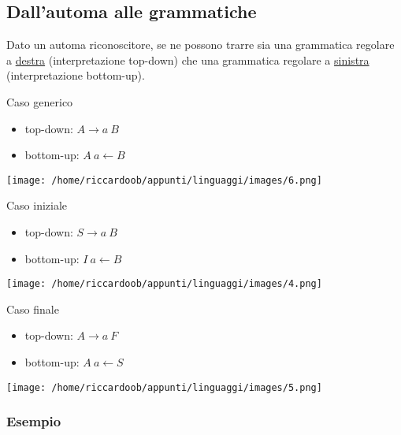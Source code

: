 \subsection{Dall'automa alle grammatiche}
Dato un automa riconoscitore, se ne possono trarre sia una grammatica regolare a \underline{destra} (interpretazione top-down) che una grammatica regolare a \underline{sinistra} (interpretazione bottom-up).
\noindent\\
\begin{multicols}{2} 
Caso generico
\begin{itemize}
    \item top-down:     $A \rightarrow a\ B$
    \item bottom-up:     $A\ a \leftarrow B$
\end{itemize}    
\columnbreak
\begin{multicolfigure}
    \centering
    \texttt{[image: /home/riccardoob/appunti/linguaggi/images/6.png]}
\end{multicolfigure}
\end{multicols}
\begin{multicols}{2}
    \noindent
    Caso iniziale
    \begin{itemize}
        \item top-down:     $S \rightarrow a\ B$
        \item bottom-up:    $I\ a \leftarrow B$
    \end{itemize}
    \begin{multicolfigure}
        \centering
        \texttt{[image: /home/riccardoob/appunti/linguaggi/images/4.png]}
    \end{multicolfigure}
    \columnbreak
    \noindent
    Caso finale
    \begin{itemize}
        \item top-down:     $A \rightarrow a\ F$
        \item bottom-up:    $A\ a \leftarrow S$
    \end{itemize}
    \begin{multicolfigure}
        \centering
        \texttt{[image: /home/riccardoob/appunti/linguaggi/images/5.png]}
    \end{multicolfigure}
\end{multicols}

\subsubsection{Esempio}

